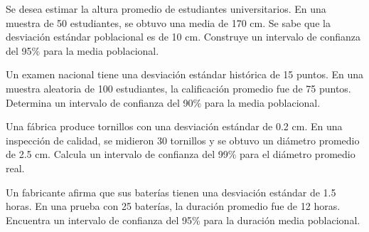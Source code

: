 \documentclass[addpoints,12pt]{exam}
\theoremstyle{plain}
\theoremstyle{remark}
\theoremstyle{definition}
\begin{document}
\begin{questions}

 
  \question  Se desea estimar la altura promedio de estudiantes universitarios. En una muestra de 50 estudiantes, se obtuvo una media de 170 cm. Se sabe que la desviación estándar poblacional es de 10 cm. Construye un intervalo de confianza del 95\% para la media poblacional.
 
 \question Un examen nacional tiene una desviación estándar histórica de 15 puntos. En una muestra aleatoria de 100 estudiantes, la calificación promedio fue de 75 puntos. Determina un intervalo de confianza del 90\% para la media poblacional.
 
 \question Una fábrica produce tornillos con una desviación estándar de 0.2 cm. En una inspección de calidad, se midieron 30 tornillos y se obtuvo un diámetro promedio de 2.5 cm. Calcula un intervalo de confianza del 99\% para el diámetro promedio real.
 
 \question Un fabricante afirma que sus baterías tienen una desviación estándar de 1.5 horas. En una prueba con 25 baterías, la duración promedio fue de 12 horas. Encuentra un intervalo de confianza del 95\% para la duración media poblacional.
 

\end{questions}
\end{document}
